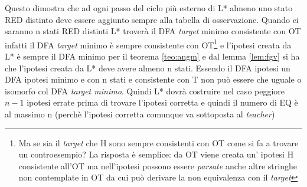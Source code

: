 Questo dimostra che ad ogni passo del ciclo più esterno di L* almeno uno stato RED distinto deve essere aggiunto sempre alla tabella di osservazione. Quando ci saranno n stati RED distinti L* troverà il DFA \textit{target} minimo consistente con OT infatti il DFA \textit{target} minimo è sempre consistente con OT\footnote{Ma se sia il \textit{target} che \ac{H} sono sempre consistenti con OT come si fa a trovare un controesempio? La risposta è semplice: da OT viene creata un' ipotesi \ac{H} consistente all'OT ma nell'ipotesi possono essere \textit{parsate} anche altre stringhe non contemplate in OT da cui può derivare la non equivalenza con il \textit{target}} e l'ipotesi creata da L* è sempre il DFA minimo per il teorema \ref{teo:angm} e dal lemma \ref{lem:fgv} si ha che l'ipotesi creata da L* deve avere almeno n stati.
Essendo il DFA ipotesi un DFA ipotesi minimo e con n stati e consistente con T non può essere che uguale o isomorfo col DFA \textit{target minimo}.  Quindi L* dovrà costruire nel caso peggiore $n-1$ ipotesi errate prima di trovare l'ipotesi corretta e quindi il numero di \ac{EQ} è al massimo n (perchè l'ipotesi corretta comunque va sottoposta al \textit{teacher})

